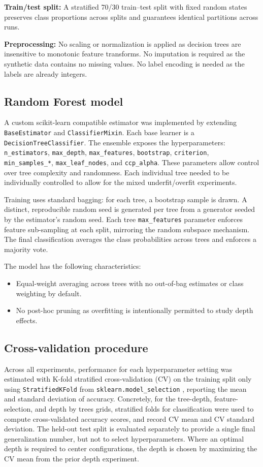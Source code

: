 \documentclass[conference]{IEEEtran}
\begin{document}
  \textbf{Train/test split:} A stratified 70/30 train--test split with fixed random states preserves class proportions across splits and guarantees identical partitions across runs.


\textbf{Preprocessing:} No scaling or normalization is applied as decision trees are insensitive to monotonic feature transforms. No imputation is required as the synthetic data contains no missing values. No label encoding is needed as the labels are already integers.

\subsection{Random Forest model}

A custom scikit-learn compatible estimator was implemented by extending \texttt{BaseEstimator} and \texttt{ClassifierMixin}. Each base learner is a \texttt{DecisionTreeClassifier}. The 
ensemble exposes the hyperparameters: \texttt{n\_estimators}, \texttt{max\_depth}, \texttt{max\_features}, \texttt{bootstrap}, \texttt{criterion}, 
\texttt{min\_samples\_*}, \texttt{max\_leaf\_nodes}, and \texttt{ccp\_alpha}. These parameters allow control over tree complexity and randomness. Each individual tree needed 
to be individually controlled to allow for the mixed underfit/overfit experiments.

Training uses standard bagging: for each tree, a bootstrap sample is drawn. A distinct, reproducible random seed is generated per tree from a generator seeded by the estimator's random seed. Each tree \texttt{max\_features} parameter enforces feature sub-sampling at each split, mirroring the random subspace mechanism. The final classification averages the class probabilities across trees and enforces a majority vote.

The model has the following characteristics:
\begin{itemize}
  \item Equal-weight averaging across trees with no out-of-bag estimates or class weighting by default.
  \item No post-hoc pruning as overfitting is intentionally permitted to study depth effects.
\end{itemize}


\subsection{Cross-validation procedure}
Across all experiments, performance for each hyperparameter setting was estimated with K-fold stratified cross-validation (CV) on the training split only using \texttt{StratifiedKFold} from \texttt{sklearn.model\_selection} \cite{scikit-learn}, 
reporting the mean and standard deviation of accuracy. Concretely, for the tree-depth, feature-selection, and depth by trees grids, stratified folds for classification were used to compute cross-validated accuracy scores, and record CV mean and CV standard deviation. The held-out test split is evaluated separately to provide a single final generalization number, but not to select hyperparameters. Where an optimal depth is required to center configurations, the depth is chosen by maximizing the CV mean from the prior depth experiment.
\end{document}
